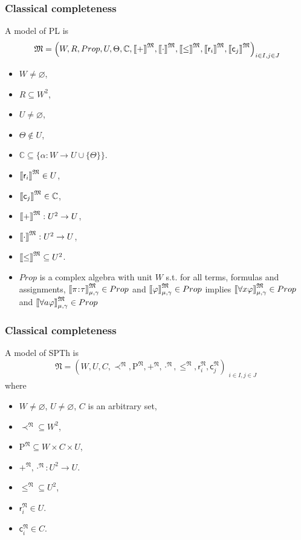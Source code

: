 \documentclass[xcolor=x11names]{beamer}
\newcommand{\bemph}[1] {{\color{DeepSkyBlue3}{#1}}}
\newcommand{\future}{\prec}
\newcommand{\points}[1][0]{\hspace{#1ex}\hspace{-.5ex}:\hspace{-.5ex}\hspace{#1ex}}
\newcommand{\Points}{\mathrm{P}}
\newcommand{\magyi}[1]{\textup{\bemph{\tiny #1}}}
\newcommand{\wintension}[3][]{{[}\hspace{-.46mm}{[} {#3}{]}\hspace{-.46mm}{]}^{\mathfrak{#1}}_{#2}}
\newcommand{\intension}[2][]{{[}\hspace{-.46mm}{[} {#2}{]}\hspace{-.46mm}{]}^{\mathfrak{#1}}}
\begin{document}
\begin{frame}[t]
\frametitle{Classical completeness}
\footnotesize
A model of PL is
\[\mathfrak M = \left( W, R, Prop,
U, \Theta, \mathbb C, \intension[M]{+}, \intension[M]{\cdot}, \intension[M]{\leq}, \intension[M]{\mathsf r_i}, \intension[M]{\mathsf c_j}\right)_{\substack{i\in I,j\in J }}\]

\begin{itemize}
\item $W\neq \varnothing$,\hfill \magyi{the set of events/possible worlds}
\item $R\subseteq W^2$,\hfill \magyi{causal future relation}
\item $U\neq \varnothing$,\hfill \magyi{numbers}
\item $\Theta\notin U$,\hfill \magyi{semantic value gap}
\item $\mathbb C \subseteq \{ \alpha : {W}\to U\cup \{\Theta\}\}$.\hfill  \magyi{possible pointers}
\item $\intension[M]{\mathsf r_i} \in U$, \hfill \magyi{number constants}
\item $\intension[M]{\mathsf c_j} \in \mathbb C$, \hfill \magyi{pointer constants}
\item $\intension[M]{+} : U^2\to U$, \hfill \magyi{addition}
\item $\intension[M]{\cdot} : U^2\to U$,\hfill \magyi{multiplication}
\item $\intension[M]{\leq} \subseteq  U^2$.\hfill \magyi{ordering}
\item $Prop$ is a complex algebra with unit $W$ s.t. for all terms, formulas and assignments, $\wintension[M]{\mu, \gamma}{\pi \points \tau}\in Prop$ and $\wintension[M]{\mu, \gamma}{\varphi}\in Prop$ implies $\wintension[M]{\mu, \gamma}{\forall x \varphi}\in Prop$ and $\wintension[M]{\mu, \gamma}{\forall a \varphi}\in Prop$ \,\hfill \magyi{admissible propositions}
\end{itemize}



\end{frame}

\begin{frame}[t]
\frametitle{Classical completeness}
\footnotesize
A model of SPTh is
\[ \mathfrak N = \left(W, U, C, \future^{\mathfrak N}, \Points^{\mathfrak N}, +^{\mathfrak N}, \cdot^{\mathfrak N},\leq^{\mathfrak N},\mathsf r_i^{\mathfrak N}, \mathsf c_j^{\mathfrak N}\right)_{\substack{i\in I,j\in J }}\]
where
\begin{itemize}
\item $W\neq \varnothing$, $U\neq \varnothing$, $C$ is an arbitrary set,
\item $\future^{\mathfrak N}\subseteq W^2 $,
\item $\Points^{\mathfrak N}\subseteq W\times C\times U $,
\item $+^{\mathfrak N}, \cdot^{\mathfrak N}:U^2\to U $.
\item $\leq^{\mathfrak N}\subseteq U^2 $,
\item $\mathsf r_i^{\mathfrak N}\in U $.
\item $\mathsf c_i^{\mathfrak N}\in C $.
\end{itemize}
\end{frame}
\end{document}
